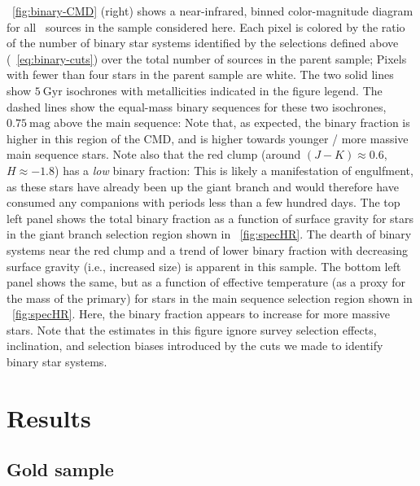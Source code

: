\documentclass[modern]{aastex63}
\begin{document}
\figurename~\ref{fig:binary-CMD} (right) shows a near-infrared, binned
color-magnitude diagram for all \apogee\ sources in the sample considered here.
Each pixel is colored by the ratio of the number of binary star systems
identified by the selections defined above (\equationname~\ref{eq:binary-cuts})
over the total number of sources in the parent sample; Pixels with fewer than
four stars in the parent sample are white.
The two solid lines show $5~\mathrm{Gyr}$  isochrones
\cite{Dotter:2016, Choi:2016, Paxton:2011, Paxton:2013, Paxton:2015} with
metallicities indicated in the figure legend.
The dashed lines show the equal-mass binary sequences for these two isochrones,
$0.75~\mathrm{mag}$ above the main sequence: Note that, as expected, the binary
fraction is higher in this region of the CMD, and is higher towards younger /
more massive main sequence stars.
Note also that the red clump (around $(J-K) \approx 0.6$, $H \approx -1.8$) has
a \emph{low} binary fraction: This is likely a manifestation of engulfment, as
these stars have already been up the giant branch and would therefore have
consumed any companions with periods less than a few hundred days.
The top left panel shows the total binary fraction as a function of surface
gravity for stars in the giant branch selection region shown in
\figurename~\ref{fig:specHR}.
The dearth of binary systems near the red clump and a trend of lower binary
fraction with decreasing surface gravity (i.e., increased size) is apparent in
this sample.
The bottom left panel shows the same, but as a function of effective temperature
(as a proxy for the mass of the primary) for stars in the main sequence
selection region shown in \figurename~\ref{fig:specHR}.
Here, the binary fraction appears to increase for more massive stars.
Note that the estimates in this figure ignore survey selection effects,
inclination, and selection biases introduced by the cuts we made to identify
binary star systems.

\section{Results} \label{sec:results}

\subsection{Gold sample}
\end{document}
